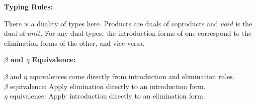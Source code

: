 \documentclass{notes}
\begin{document}
\bf{Typing Rules:}
\begin{nb}
  There is a duality of types here. Products are duals of coproducts and $void$ is
  the dual of $unit$. For any dual types, the introduction forms of one correspond 
  to the elimination forms of the other, and vice versa.
\end{nb}

\vspace{0.3in}

\bf{$\beta$ and $\eta$ Equivalence:}

\begin{nb}
  $\beta$ and $\eta$ equivalences come directly from introduction and
  elimination rules.
  \\
  $\beta$ equivalence: Apply elimination directly to an introduction form.
  \\
  $\eta$ equivalence: Apply introduction directly to an elimination form.
\end{nb}
\end{document}
